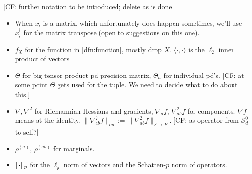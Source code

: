\documentclass[aos]{imsart}
\theoremstyle{definition}
\DeclarePairedDelimiter{\norm}{\lVert}{\rVert}
\renewcommand{\vec}{\bm}
\newcommand{\SL}{\operatorname{SL}}
\newcommand{\PD}{\operatorname{P}}
\newcommand{\Sym}{\mathcal{S}}
\newcommand{\smallSym}{S}
\newcommand{\SPD}{\mathcal{P}}
\newcommand{\samp}{x}
\newcommand{\rv}{X}
\newcommand{\CF}[1]{{\color{purple}[CF: #1]}}
\newcommand{\MW}[1]{{\color{red}[MW: #1]}}
\begin{document}
\CF{further notation to be introduced; delete as is done}
\begin{itemize}

\item When $x_i$ is a matrix, which unfortunately does happen sometimes, we'll use $x_i^\dagger$ for the matrix transpose (open to suggestions on this one).
\item $f_{\rv}$ for the function in \cref{dfn:function}, mostly drop $\rv$. $\langle \cdot, \cdot \rangle$ is the $\ell_2$ inner product of vectors

\item $\Theta$ for big tensor product pd precision matrix, $\Theta_a$ for individual pd's. \CF{at some point $\Theta$ gets used for the tuple. We need to decide what to do about this.}

\item $\nabla, \nabla^2$ for Riemannian Hessians and gradients, $\nabla_a f$, $\nabla^2_{ab} f$ for components. $\nabla f$ means at the identity. $\|\nabla^2_{ab}f\|_{op}:=\|\nabla^2_{ab}f\|_{F\to F}$. \CF{as operator from $\Sym_{d}^0$ to self?}
\item $\rho^{(a)}$, $\rho^{(ab)}$ for marginals.
\item $\norm{\cdot}_p$ for the $\ell_p$ norm of vectors and the Schatten-$p$ norm of operators.
\end{itemize}
\end{document}
